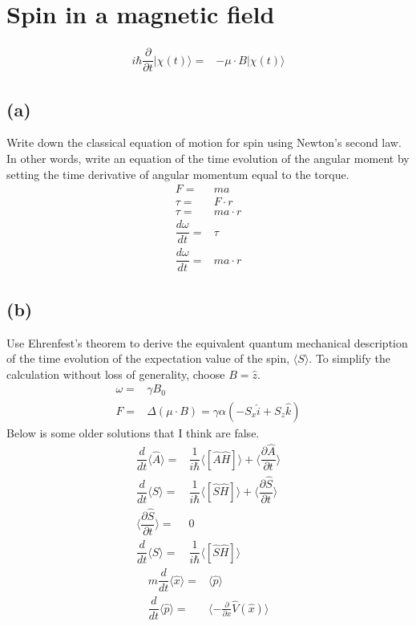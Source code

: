 \documentclass[12pt, a4paper]{article}
\begin{document}
\section{Spin in a magnetic field}
\begin{align*}
i\hbar \dfrac{\partial}{\partial t} |\chi(t)\rangle =& -\mu\cdot B|\chi(t)\rangle
\end{align*}
\subsection*{(a)}
Write down the classical equation of motion for spin using Newton's second law. In other words, write an equation of the time evolution of the angular moment by setting the time derivative of angular momentum equal to the torque.
\begin{align*}
F =& ma
\\
\tau =& F\cdot r
\\
\tau =& ma\cdot r
\\
\dfrac{d\omega}{dt} =& \tau
\\
\dfrac{d\omega}{dt} =& ma\cdot r
\end{align*}

\subsection*{(b)}
Use Ehrenfest’s theorem to derive the equivalent quantum mechanical description of the time evolution of the expectation value of the spin, $\langle S\rangle$. To simplify the calculation without loss of
generality, choose $B = \hat{z}$.
\begin{align*}
\omega =& \gamma B_0
\\
F =& \Delta(\mu\cdot B) = \gamma\alpha\left(-S_x\hat{i}+S_z\hat{k}\right)
\end{align*}
Below is some older solutions that I think are false.
\begin{align*}
\dfrac{d}{dt}\langle\hat{A}\rangle =& \dfrac{1}{i\hbar}\langle[\hat{A}\hat{H}]\rangle + \langle \dfrac{\partial\hat{A}}{\partial t}\rangle
\\
\dfrac{d}{dt}\langle\hat{S}\rangle =& \dfrac{1}{i\hbar}\langle[\hat{S}\hat{H}]\rangle + \langle \dfrac{\partial\hat{S}}{\partial t}\rangle
\\
\langle \dfrac{\partial\hat{S}}{\partial t}\rangle =& 0 
\\
\dfrac{d}{dt}\langle\hat{S}\rangle =& \dfrac{1}{i\hbar}\langle[\hat{S}\hat{H}]\rangle
\end{align*}
\begin{align*}
m\dfrac{d}{dt}\langle\hat{x}\rangle =& \langle\hat{p}\rangle
\\
\dfrac{d}{dt}\langle\hat{p}\rangle =& \langle-\frac{\partial}{\partial x}\hat{V}(\hat{x})\rangle
\end{align*}
\end{document}
